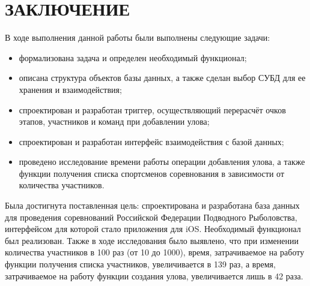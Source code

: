 \section*{ЗАКЛЮЧЕНИЕ}

В ходе выполнения данной работы были выполнены следующие задачи:

\begin{itemize}[label=---]
	\item формализована задача и определен необходимый функционал;
	\item описана структура объектов базы данных, а также сделан выбор СУБД для ее хранения и взаимодействия;
	\item спроектирован и разработан триггер, осуществляющий перерасчёт очков этапов, участников и команд при добавлении улова;
	\item спроектирован и разработан интерфейс взаимодействия с базой данных;
	\item проведено исследование времени работы операции добавления улова, а также функции получения списка спортсменов соревнования в зависимости от количества участников.
\end{itemize}

Была достигнута поставленная цель: спроектирована и разработана база данных для проведения соревнований Российской Федерации Подводного Рыболовства, интерфейсом для которой стало приложения для iOS. Необходимый функционал был реализован.
Также в ходе исследования было выявлено, что при изменении количества участников в 100 раз (от 10 до 1000), время, затрачиваемое на работу функции получения списка участников, увеличивается в 139 раз, а время, затрачиваемое на работу функции создания улова, увеличивается лишь в 42 раза.

\pagebreak